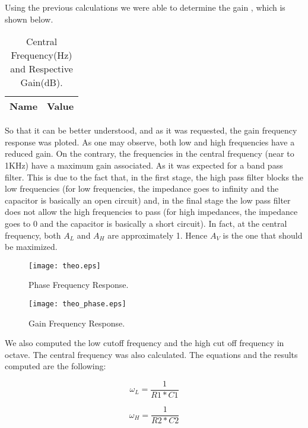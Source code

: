 Using the previous calculations we were able to determine the gain , which is shown below.

\begin{table}[ht]
  \centering
  \begin{tabular}{|l|r|}
    \hline    
    {\bf Name} & {\bf Value} \\ \hline
    
  \end{tabular}
  \caption{Central Frequency(Hz) and Respective Gain(dB).}
\end{table}

So that it can be better understood, and as it was requested, the gain frequency response was ploted. As one may observe, both low and high frequencies have a reduced gain. On the contrary, the frequencies in the central frequency (near to 1KHz) have a maximum gain associated. As it was expected for a band pass filter. This is due to the fact that, in the first stage, the high pass filter blocks the low frequencies (for low frequencies, the impedance goes to infinity and the capacitor is basically an open circuit)  and, in the final stage the low pass filter does not allow the high frequencies to pass (for high impedances, the impedance goes to 0 and the capacitor is basically a short circuit). In fact, at the central frequency, both $A_{L}$ and $A_{H}$ are approximately 1. Hence $A_{V}$ is the one that should be maximized.

\newpage

\begin{figure}[h] \centering
\texttt{[image: theo.eps]}
\caption{Phase Frequency Response.}
\label{sh}
\end{figure}

\begin{figure}[h] \centering
\texttt{[image: theo\_phase.eps]}
\caption{Gain Frequency Response.}
\label{sh2}
\end{figure}


We also computed the low cutoff frequency and the high cut off frequency in octave. The central frequency was also calculated. The equations and the results computed are the following:


\begin{equation}
\omega_{L}= \frac{1}{R1*C1}
\end{equation}

\begin{equation}
\omega_{H}= \frac{1}{R2*C2}
\end{equation}

